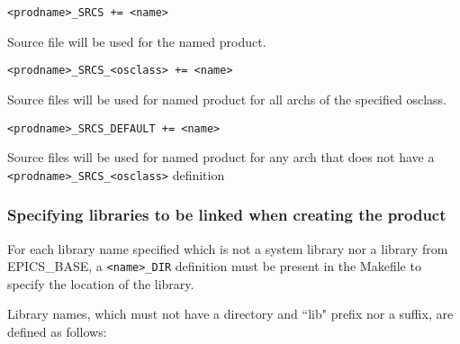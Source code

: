 \begin{description}
\item

\item {}\verb|<prodname>_SRCS += <name>|

Source file will be used for the named product.

\item \verb|<prodname>_SRCS_<osclass> += <name>|

Source files will be used for named product for all archs of the specified osclass.

\item \verb|<prodname>_SRCS_DEFAULT += <name>|

Source files will be used for named product for any arch that does not have a \verb|<prodname>_SRCS_<osclass>| 
definition

\end{description}

\subsubsection{Specifying libraries to be linked when creating the product}

For each library name specified which is not a system library nor a library from EPICS\_BASE, a \verb|<name>_DIR| definition 
must be present in the Makefile to specify the location of the library. 

Library names, which must not have a directory and ``lib" prefix nor a suffix, are defined as follows:


